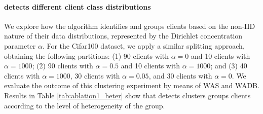 \paragraph{\shortname detects different client class distributions}
We explore how the algorithm identifies and groups clients based on the non-IID nature of their data distributions, represented by the Dirichlet concentration parameter $\alpha$. For the Cifar100 dataset, we apply a similar splitting approach, obtaining the following partitions: (1) 90 clients with $\alpha = 0$ and 10 clients with $\alpha = 1000$; (2) 90 clients with $\alpha = 0.5$ and 10 clients with $\alpha = 1000$; and (3) 40 clients with $\alpha = 1000$, 30 clients with $\alpha = 0.05$, and 30 clients with $\alpha = 0$. We evaluate the outcome of this clustering experiment by means of WAS and WADB. Results in Table \ref{tab:ablation1_heter} show that \shortname detects clusters groups clients according to the level of heterogeneity of the group.
